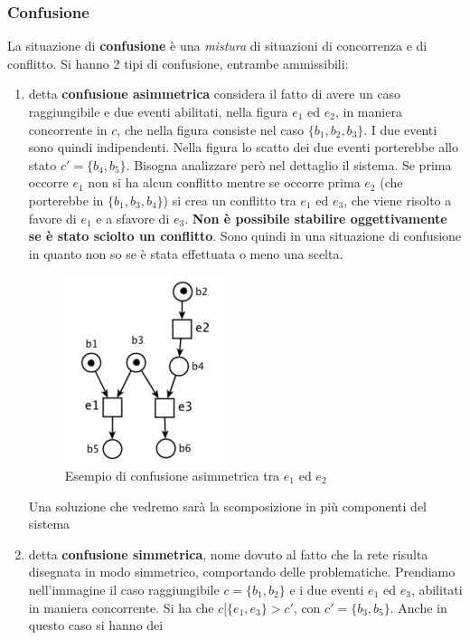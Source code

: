 \documentclass[a4paper,12pt, oneside]{book}
\begin{document}
\subsubsection{Confusione}
\begin{definizione}
  La situazione di \textbf{confusione} è una \textit{mistura} di situazioni di
  concorrenza e di conflitto. Si hanno 2 tipi di confusione, entrambe
  ammissibili: 
  \begin{enumerate}
    \item detta \textbf{confusione asimmetrica} considera il fatto di avere un
    caso raggiungibile e due eventi abilitati, nella figura $e_1$ ed $e_2$, in
    maniera concorrente in $c$, che nella figura consiste nel caso
    $\{b_1,b_2,b_3\}$. I due eventi sono quindi indipendenti. Nella figura lo
    scatto dei due eventi porterebbe allo stato $c'=\{b_4,b_5\}$. Bisogna
    analizzare però nel dettaglio il sistema. Se prima occorre $e_1$ non si ha
    alcun conflitto mentre se occorre prima $e_2$ (che porterebbe in
    $\{b_1,b_3,b_4\}$) si crea un conflitto tra $e_1$ ed $e_3$, che viene
    risolto a favore di $e_1$ e a sfavore di $e_3$. \textbf{Non è possibile
      stabilire oggettivamente se è stato sciolto un conflitto}. Sono quindi in
    una situazione di confusione in quanto non so se è stata effettuata o meno
    una scelta.
    \begin{figure}[H]
      \centering
      \includegraphics[scale = 0.7]{img/confu.jpg}
      \caption{Esempio di confusione asimmetrica tra $e_1$ ed $e_2$} 
    \end{figure}
    Una soluzione che vedremo sarà la scomposizione in più componenti del
    sistema 
    \item detta \textbf{confusione simmetrica}, nome dovuto al fatto che la rete
    risulta disegnata in modo simmetrico, comportando delle
    problematiche. Prendiamo nell'immagine il caso raggiungibile $c=\{b_1,b_2\}$
    e i due eventi $e_1$ ed $e_3$, abilitati in maniera concorrente. Si ha che
    $c[\{e_1,e_3\}>c'$, con $c'=\{b_3,b_5\}$. Anche in questo caso si hanno dei

\end{enumerate}
\end{definizione}
\end{document}
